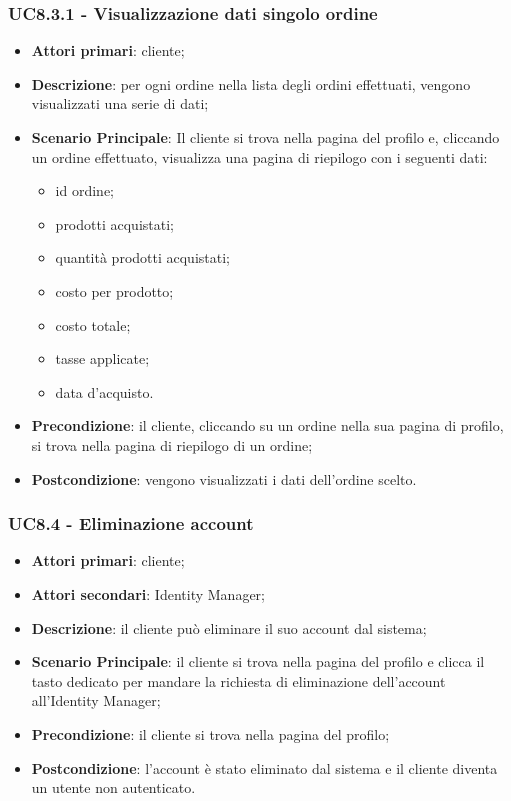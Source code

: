 \subsubsection{UC8.3.1 - Visualizzazione dati singolo ordine}
\begin{itemize}
\item \textbf{Attori primari}: cliente;
\item \textbf{Descrizione}: per ogni ordine nella lista degli ordini effettuati, vengono visualizzati una serie di dati;
\item \textbf{Scenario Principale}: Il cliente si trova nella pagina del profilo e, cliccando un ordine effettuato, visualizza  una pagina di riepilogo con i seguenti dati:
\begin{itemize}
\item id ordine;
\item prodotti acquistati;
\item quantità prodotti acquistati;
\item costo per prodotto;
\item costo totale;
\item tasse applicate;
\item data d'acquisto.
\end{itemize}
\item \textbf{Precondizione}: il cliente, cliccando su un ordine nella sua pagina di profilo, si trova nella pagina di riepilogo di un ordine;
\item \textbf{Postcondizione}: vengono visualizzati i dati dell'ordine scelto.
\end{itemize}

\subsubsection{UC8.4 - Eliminazione account}
\begin{itemize}
\item \textbf{Attori primari}: cliente;
\item \textbf{Attori secondari}: Identity Manager;
\item \textbf{Descrizione}: il cliente può eliminare il suo account dal sistema;
\item \textbf{Scenario Principale}: il cliente si trova nella pagina del profilo e clicca il tasto dedicato per mandare la richiesta di eliminazione dell'account all'Identity Manager;
\item \textbf{Precondizione}: il cliente si trova nella pagina del profilo;
\item \textbf{Postcondizione}: l'account è stato eliminato dal sistema e il cliente diventa un utente non autenticato.
\end{itemize}
